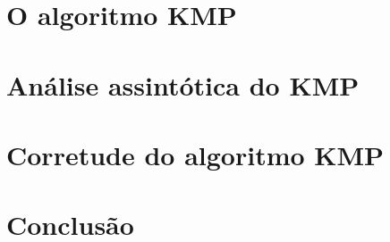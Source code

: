 \documentclass[12pt]{article}
\begin{document}
\subsection{}

\section{O algoritmo KMP}

\section{Análise assintótica do KMP}

\section{Corretude do algoritmo KMP}

\section{Conclusão}



\end{document}
